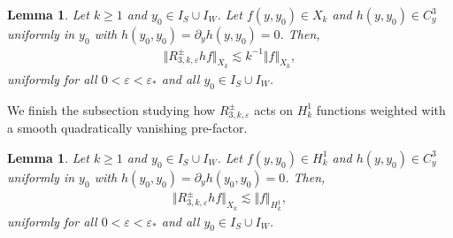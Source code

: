 \documentclass[11pt,reqno]{amsproc}
\newtheorem{lemma}[proposition]{Lemma}
\theoremstyle{definition}
\numberwithin{equation}{section}
\newcommand{\ep}{\varepsilon}
\begin{document}
\begin{lemma}\label{lemma:R3mapsC2XktoXk}
Let $k\geq 1$ and $y_0\in I_S\cup I_W$. Let $f(y,y_0)\in X_k$ and $h(y,y_0)\in C^3_y$ uniformly in $y_0$ with $h(y_0,y_0) = \partial_y h(y,y_0)=0$. Then,
\begin{align*}
\Vert R_{3,k,\ep}^\pm hf \Vert_{X_k}\lesssim k^{-1} \Vert f \Vert_{X_k},
\end{align*}
uniformly for all $0<\ep<\ep_*$ and all $y_0\in I_S\cup I_W$. 
\end{lemma}

We finish the subsection studying how $R_{3,k,\ep}^\pm$ acts on $H_k^1$ functions weighted with a smooth quadratically vanishing pre-factor.

\begin{lemma}\label{lemma:R3mapsC2H1toXk}
Let $k\geq 1$ and $y_0\in I_S\cup I_W$. Let $f(y,y_0)\in H_k^1$ and $h(y,y_0)\in C^3_y$ uniformly in $y_0$ with $h(y_0,y_0) = \partial_y h(y_0,y_0)=0$. Then,
\begin{align*}
\Vert R_{3,k,\ep}^\pm hf \Vert_{X_k}\lesssim  \Vert f \Vert_{H_k^1},
\end{align*}
uniformly for all $0<\ep<\ep_*$ and all $y_0\in I_S\cup I_W$. 
\end{lemma}
\end{document}
